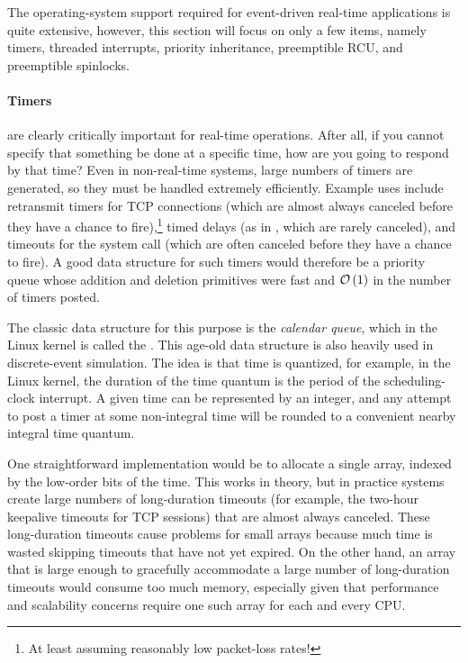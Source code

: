 The operating-system support required for event-driven real-time
applications is quite extensive, however, this section will focus
on only a few items, namely
timers,
threaded interrupts,
priority inheritance,
preemptible RCU,
and
preemptible spinlocks.

\paragraph{Timers} are clearly critically important for real-time
operations.
After all, if you cannot specify that something be done at a specific
time, how are you going to respond by that time?
Even in non-real-time systems, large numbers of timers are generated,
so they must be handled extremely efficiently.
Example uses include retransmit timers for TCP connections (which are
almost always canceled before they have a chance to fire),\footnote{
	At least assuming reasonably low packet-loss rates!}
timed delays (as in , which are rarely canceled),
and timeouts for the  system call (which are often
canceled before they have a chance to fire).
A good data structure for such timers would therefore be a priority queue
whose addition and deletion primitives were fast and $\mathcal{O}\left(1\right)$ in the number
of timers posted.

The classic data structure for this purpose is the \emph{calendar queue},
which in the Linux kernel is called the .
This age-old data structure is also heavily used in discrete-event
simulation.
The idea is that time is quantized, for example, in the Linux kernel,
the duration of the time quantum is the period of the scheduling-clock
interrupt.
A given time can be represented by an integer, and any attempt to post
a timer at some non-integral time will be rounded to a convenient nearby
integral time quantum.

One straightforward implementation would be to allocate a single array,
indexed by the low-order bits of the time.
This works in theory, but in practice systems create large numbers of
long-duration timeouts (for example, the two-hour keepalive timeouts for TCP
sessions) that are almost always canceled.
These long-duration timeouts cause problems for small arrays because
much time is wasted skipping timeouts that have not yet expired.
On the other hand, an array that is large enough to gracefully accommodate
a large number of long-duration timeouts would consume too much memory,
especially given that performance and scalability concerns require one
such array for each and every CPU\@.

